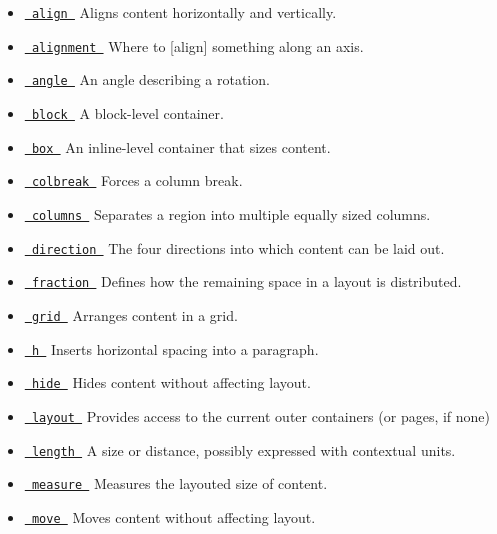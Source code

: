 \begin{itemize}
\tightlist
\item
  \href{/docs/reference/layout/align/}{\texttt{\ align\ }} { Aligns
  content horizontally and vertically. }
\item
  \href{/docs/reference/layout/alignment/}{\texttt{\ alignment\ }} {
  Where to {[}align{]} something along an axis. }
\item
  \href{/docs/reference/layout/angle/}{\texttt{\ angle\ }} { An angle
  describing a rotation. }
\item
  \href{/docs/reference/layout/block/}{\texttt{\ block\ }} { A
  block-level container. }
\item
  \href{/docs/reference/layout/box/}{\texttt{\ box\ }} { An inline-level
  container that sizes content. }
\item
  \href{/docs/reference/layout/colbreak/}{\texttt{\ colbreak\ }} {
  Forces a column break. }
\item
  \href{/docs/reference/layout/columns/}{\texttt{\ columns\ }} {
  Separates a region into multiple equally sized columns. }
\item
  \href{/docs/reference/layout/direction/}{\texttt{\ direction\ }} { The
  four directions into which content can be laid out. }
\item
  \href{/docs/reference/layout/fraction/}{\texttt{\ fraction\ }} {
  Defines how the remaining space in a layout is distributed. }
\item
  \href{/docs/reference/layout/grid/}{\texttt{\ grid\ }} { Arranges
  content in a grid. }
\item
  \href{/docs/reference/layout/h/}{\texttt{\ h\ }} { Inserts horizontal
  spacing into a paragraph. }
\item
  \href{/docs/reference/layout/hide/}{\texttt{\ hide\ }} { Hides content
  without affecting layout. }
\item
  \href{/docs/reference/layout/layout/}{\texttt{\ layout\ }} { Provides
  access to the current outer container\textquotesingle s (or
  page\textquotesingle s, if none) }
\item
  \href{/docs/reference/layout/length/}{\texttt{\ length\ }} { A size or
  distance, possibly expressed with contextual units. }
\item
  \href{/docs/reference/layout/measure/}{\texttt{\ measure\ }} {
  Measures the layouted size of content. }
\item
  \href{/docs/reference/layout/move/}{\texttt{\ move\ }} { Moves content
  without affecting layout. }

\end{itemize}
